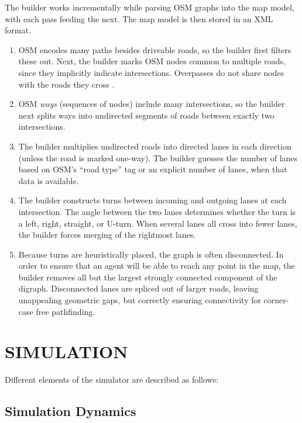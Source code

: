 \documentclass[letterpaper, 10 pt, conference]{ieeeconf}  %
\begin{document}
The builder works incrementally while parsing OSM graphs into the map model,
with each pass feeding the next. The map model is then stored in an XML format.
\begin{enumerate}
  \item OSM encodes many paths besides driveable roads, so the builder first filters
        these out. Next, the builder marks OSM nodes common to multiple roads, since
        they implicitly indicate intersections. Overpasses do not share nodes
        with the roads they cross \cite{osmOverpass}.
  \item OSM \emph{ways} (sequences of nodes) include many
        intersections, so the builder next splits ways into undirected
        segments of roads between exactly two intersections.
  \item The builder multiplies undirected roads into directed lanes in each
        direction (unless the road is marked one-way). The builder guesses the
        number of lanes based on OSM's ``road type'' tag or an explicit number of
        lanes, when that data is available.
  \item The builder constructs turns between incoming and outgoing lanes at each
        intersection. The angle between the two lanes determines whether the turn is
        a left, right, straight, or U-turn. When several lanes all cross into fewer
        lanes, the builder forces merging of the rightmost lanes. 
  \item Because turns are heuristically placed, the graph is often disconnected.
        In order to ensure that an agent will be able to reach any point in the map,
        the builder removes all but the largest strongly connected component of the
        digraph. Disconnected lanes are spliced out of larger roads, leaving
        unappealing geometric gaps, but correctly ensuring connectivity for
        corner-case free pathfinding.
\end{enumerate}


\section{SIMULATION}
\label{sec:simulation}

Different elements of the simulator are described as follows:

\subsection{Simulation Dynamics} 
\end{document}
